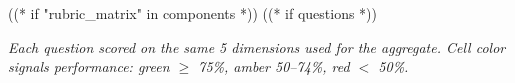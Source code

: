\documentclass[11pt,a4paper]{article}
\begin{document}
{{{%
((* if "rubric_matrix" in components *))
((* if questions *))
\par\vspace{0.4cm}


\par {\fontsize{9pt}{12pt}\selectfont\color{tsGrey}\textit{Each question scored on the same 5 dimensions used for the aggregate. Cell color signals performance: green $\geq$ 75\%, amber 50--74\%, red $<$ 50\%.}}

}}}
\end{document}
